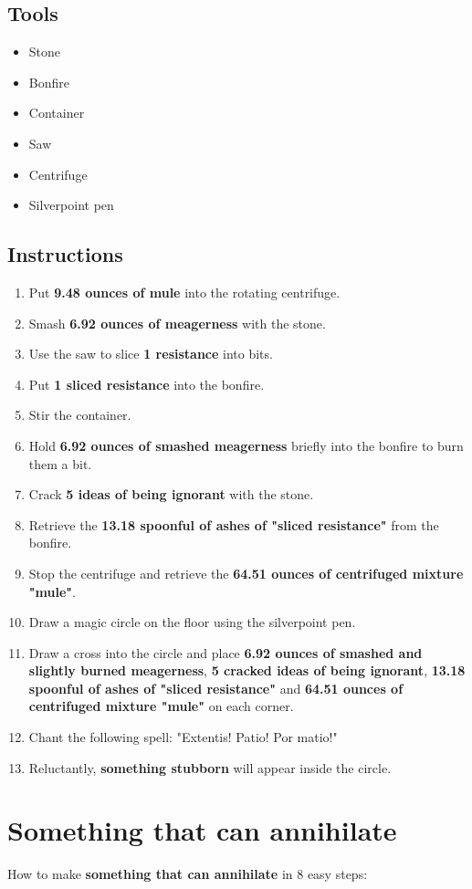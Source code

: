 \documentclass{article}
\begin{document}
\subsection{Tools}\begin{itemize}
\item 
Stone
\item 
Bonfire
\item 
Container
\item 
Saw
\item 
Centrifuge
\item 
Silverpoint pen
\end{itemize}
\subsection{Instructions}\begin{enumerate}
\item 
Put \textbf{9.48 ounces of mule} into the rotating centrifuge.
\item 
Smash \textbf{6.92 ounces of meagerness} with the stone.
\item 
Use the saw to slice \textbf{1 resistance} into bits.
\item 
Put \textbf{1 sliced resistance} into the bonfire.
\item 
Stir the container.
\item 
Hold \textbf{6.92 ounces of smashed meagerness} briefly into the bonfire to burn them a bit.
\item 
Crack \textbf{5 ideas of being ignorant} with the stone.
\item 
Retrieve the \textbf{13.18 spoonful of ashes of "sliced resistance"} from the bonfire.
\item 
Stop the centrifuge and retrieve the \textbf{64.51 ounces of centrifuged mixture "mule"}.
\item 
Draw a magic circle on the floor using the silverpoint pen.
\item 
Draw a cross into the circle and place \textbf{6.92 ounces of smashed and slightly burned meagerness}, \textbf{5 cracked ideas of being ignorant}, \textbf{13.18 spoonful of ashes of "sliced resistance"} and \textbf{64.51 ounces of centrifuged mixture "mule"} on each corner.
\item 
Chant the following spell: "Extentis! Patio! Por matio!"
\item 
Reluctantly, \textbf{something stubborn} will appear inside the circle.
\end{enumerate}
\newpage
\section{Something that can annihilate}How to make \textbf{something that can annihilate} in 8 easy steps:
\end{document}
